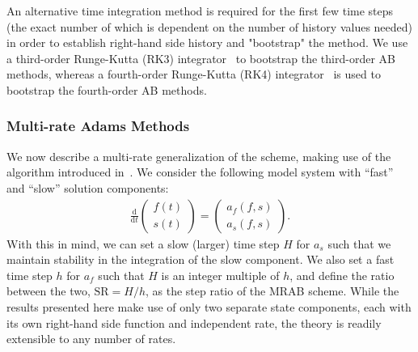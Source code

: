 An alternative time integration method is required for the first few time steps
(the exact number of which is dependent on the number of history values needed)
in order to establish right-hand side history and "bootstrap" the method.  We
use a third-order Runge-Kutta (RK3) integrator~\cite{heun1900neue} to bootstrap
the third-order AB methods, whereas a fourth-order Runge-Kutta (RK4)
integrator~\cite{kutta1901beitrag} is used to bootstrap the fourth-order AB
methods.


\subsubsection{Multi-rate Adams Methods}

We now describe a multi-rate generalization of the scheme, making use of the
algorithm introduced in~\cite{gear1984multirate}.  We consider the following
model system with ``fast'' and ``slow'' solution components:
\begin{align}
\frac{\textrm{d}}{\textrm{d}t}\left( \begin{array}{c} f(t) \\ s(t) \end{array} \right) = \left( \begin{array}{c} a_{f}(f,s) \\ a_{s}(f,s) \end{array} \right). \label{eq:mrab}
\end{align}
With this in mind, we can set a slow (larger) time step $H$ for $a_{s}$ such
that we maintain stability in the integration of the slow component.  We also
set a fast time step $h$ for $a_{f}$ such that $H$ is an integer multiple of
$h$, and define the ratio between the two, $\text{SR} = H/h$, as the step ratio
of the MRAB scheme. While the results presented here make use of only two 
separate state components, each with its own right-hand side function and
independent rate, the theory is readily extensible to any number of rates.


